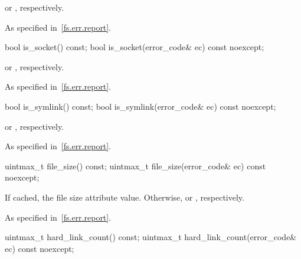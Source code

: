 \begin{itemdescr}
\pnum
\returns
{} or , respective\-ly.

\pnum
\throws
As specified in~\ref{fs.err.report}.
\end{itemdescr}

%
\begin{itemdecl}
bool is_socket() const;
bool is_socket(error_code& ec) const noexcept;
\end{itemdecl}

\begin{itemdescr}
\pnum
\returns
{} or , respectively.

\pnum
\throws
As specified in~\ref{fs.err.report}.
\end{itemdescr}

%
\begin{itemdecl}
bool is_symlink() const;
bool is_symlink(error_code& ec) const noexcept;
\end{itemdecl}

\begin{itemdescr}
\pnum
\returns
{} or , respectively.

\pnum
\throws
As specified in~\ref{fs.err.report}.
\end{itemdescr}

%
\begin{itemdecl}
uintmax_t file_size() const;
uintmax_t file_size(error_code& ec) const noexcept;
\end{itemdecl}

\begin{itemdescr}
\pnum
\returns
If cached, the file size attribute value.
Otherwise,  or , respectively.

\pnum
\throws
As specified in~\ref{fs.err.report}.
\end{itemdescr}

%
\begin{itemdecl}
uintmax_t hard_link_count() const;
uintmax_t hard_link_count(error_code& ec) const noexcept;
\end{itemdecl}

